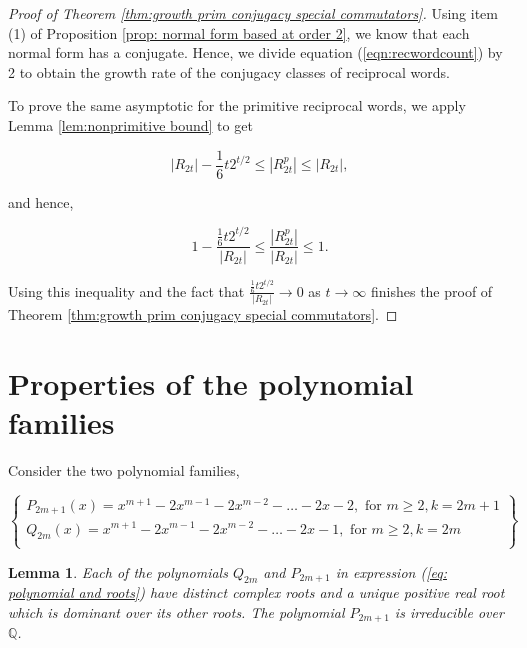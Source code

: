 \documentclass[11pt]{amsart}
\numberwithin{equation}{section}
\theoremstyle{plain}
\newtheorem{lem}[thm]{Lemma}
\begin{document}
\begin{proof}[Proof of Theorem \ref{thm:growth prim conjugacy special commutators}]

Using item (1) of Proposition \ref{prop: normal form based at order 2},  we know that each normal form has a conjugate. Hence, we divide  equation (\ref{eqn:recwordcount}) by 2  to  obtain the growth rate of the conjugacy classes of reciprocal words.  

To prove the same asymptotic for the primitive reciprocal words, we apply  Lemma  \ref{lem:nonprimitive bound}  to get

\begin{equation}\label{eq:bounds1}
|R_{2t}|-\frac{1}{6} t  2^{t/2} \leq  |R^{p}_{2t}|\leq  |R_{2t}|,
\end{equation}

and hence,

\begin{equation}\label{eq:bounds2}
1-\frac{\frac{1}{6} t  2^{t/2}}{|R_{2t}|} \leq \frac{|R^{p}_{2t}|}{|R_{2t}|} \leq 1.
\end{equation}

Using this inequality and the fact  that $\frac{\frac{1}{6} t  2^{t/2}}{|R_{2t}|} \longrightarrow 0$ as $t \longrightarrow \infty$ finishes the proof of 
Theorem \ref{thm:growth prim conjugacy special commutators}.
\end{proof}

	


\section{Properties of the polynomial families} \label{sec: Summary}\label{sec: poly properties}

Consider the two polynomial families,


\begin{equation}\label{eq: polynomial and roots}
\left\{
\begin{array}{lr }
    P_{2m+1}(x)=   x^{m+1} -2x^{m-1}-2x^{m-2} - \dots -2x-2, \text{ for $m\geq 2, k=2m+1$}    \\
  Q_{2m}(x)=x^{m+1} -2x^{m-1} -2x^{m-2}- \dots -2x-1, \text{ for $m \geq 2, k=2m$}  \\
\end{array}
\right\}
\end{equation}



\begin{lem} \label{lem: dominant root}
Each of the polynomials $Q_{2m}$ and  $P_{2m+1}$  in expression (\ref{eq: polynomial and roots})  have distinct  complex roots  and   a unique positive real root which is dominant over its other  roots.  The polynomial $P_{2m+1}$ is irreducible over $\mathbb{Q}$.
\end{lem}
\end{document}
